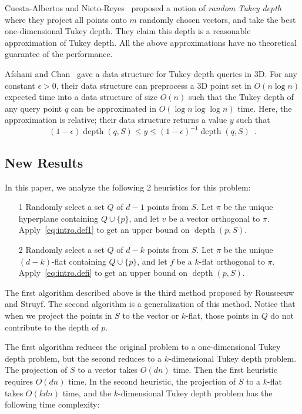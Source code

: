 \documentclass [letterpaper] {article}
\DeclareMathOperator{\depth}{depth}
\begin{document}
Cuesta-Albertos and Nieto-Reyes~\cite{Cuesta08} proposed a notion of \emph{random Tukey depth} where they project all points onto $m$ randomly chosen vectors,  and take the best one-dimensional Tukey depth. They claim this depth is a reasonable approximation of Tukey depth. All the above approximations have no theoretical guarantee of the performance.

Afshani and Chan~\cite{Afshani07} gave a data structure for Tukey depth queries in 3D.  For any constant $\epsilon >0$, their data structure can preprocess a 3D point set in $O(n\log n)$ expected time into a data structure of size $O(n)$ such that the Tukey depth of any query point $q$ can be approximated in $O(\log n\log\log n)$ time.  Here, the approximation is relative; their data structure returns a value $y$ such that
\[
   (1-\epsilon)\depth(q,S) \le y \le (1-\epsilon)^{-1}\depth(q,S) \enspace .
\]

\subsection{New Results}

In this paper, we analyze the following 2 heuristics for this problem:
\begin{itemize}
\item [1] Randomly select a set $Q$ of $d - 1$ points from $S$. Let $\pi$ be the unique hyperplane containing $Q \cup \{p\}$, and let $v$ be a vector orthogonal to $\pi$. Apply~\eqref{eq:intro.def1} to get an upper bound on $\depth{(p, S)}$.\label{page:heuristic1}
\item [2] Randomly select a set $Q$ of $d - k$ points from $S$. Let $\pi$ be the unique $(d - k)$-flat containing $Q \cup \{p\}$, and let $f$ be a $k$-flat orthogonal to $\pi$. Apply~\eqref{eq:intro.defi} to get an upper bound on $\depth{(p, S)}$.\label{page:heuristic2}
\end{itemize}
The first algorithm described above is the third method proposed by Rousseeuw and Struyf.  The second algorithm is a generalization of this method.  Notice that when we project the points in $S$ to the vector or $k$-flat, those points in $Q$ do not contribute to the depth of $p$.

The first algorithm reduces the original problem to a one-dimensional Tukey depth problem, but the second reduces to a $k$-dimensional Tukey depth problem. The projection of $S$ to a vector takes $O(dn)$ time. Then the first heuristic requires $O(dn)$ time. In the second heuristic, the projection of $S$ to a $k$-flat takes $O(kdn)$ time, and the $k$-dimensional Tukey depth problem has the following time complexity:
\end{document}
